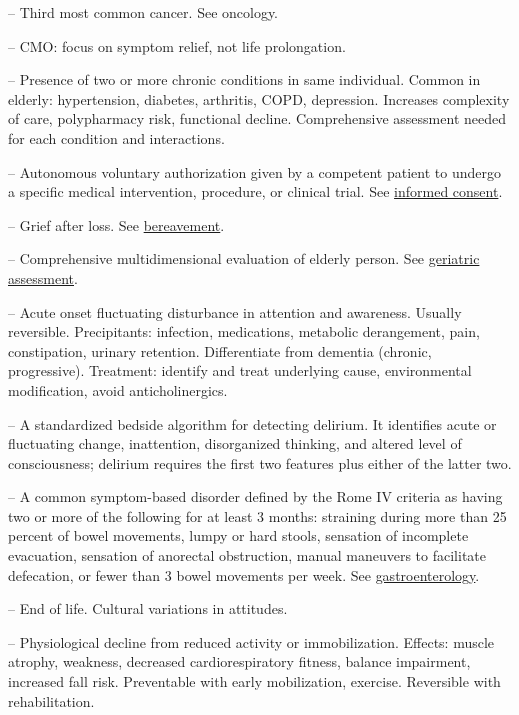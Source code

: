 -- Third most common cancer. See oncology.

-- CMO: focus on symptom relief, not life prolongation.

-- Presence of two or more chronic conditions in same individual. Common in elderly: hypertension, diabetes, arthritis, COPD, depression. Increases complexity of care, polypharmacy risk, functional decline. Comprehensive assessment needed for each condition and interactions.

-- Autonomous voluntary authorization given by a competent patient to undergo a specific medical intervention, procedure, or clinical trial. See \hyperlink{Informed Consent}{informed consent}.


-- Grief after loss. See \hyperlink{Bereavement}{bereavement}.

-- Comprehensive multidimensional evaluation of elderly person. See \hyperlink{Geriatric Assessment}{geriatric assessment}.

-- Acute onset fluctuating disturbance in attention and awareness. Usually reversible. Precipitants: infection, medications, metabolic derangement, pain, constipation, urinary retention. Differentiate from dementia (chronic, progressive). Treatment: identify and treat underlying cause, environmental modification, avoid anticholinergics.

-- A standardized bedside algorithm for detecting delirium. It identifies acute or fluctuating change, inattention, disorganized thinking, and altered level of consciousness; delirium requires the first two features plus either of the latter two.

-- A common symptom-based disorder defined by the Rome IV criteria as having two or more of the following for at least 3 months: straining during more than 25 percent of bowel movements, lumpy or hard stools, sensation of incomplete evacuation, sensation of anorectal obstruction, manual maneuvers to facilitate defecation, or fewer than 3 bowel movements per week. See \hyperlink{Gastroenterology}{gastroenterology}.

-- End of life. Cultural variations in attitudes.


-- Physiological decline from reduced activity or immobilization. Effects: muscle atrophy, weakness, decreased cardiorespiratory fitness, balance impairment, increased fall risk. Preventable with early mobilization, exercise. Reversible with rehabilitation.

